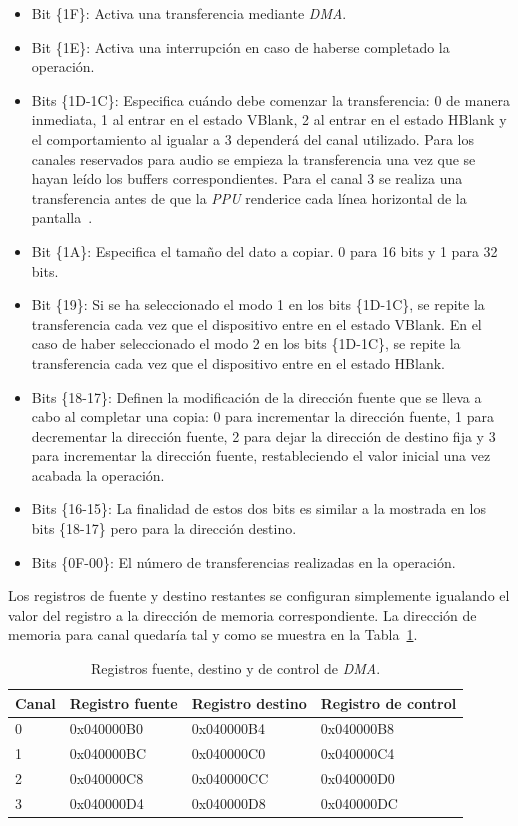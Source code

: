 {\begin{itemize}
	\item Bit \{1F\}: Activa una transferencia mediante \textit{DMA}.
	\item Bit \{1E\}: Activa una interrupción en caso de haberse completado la operación. 
	\item Bits \{1D-1C\}: Especifica cuándo debe comenzar la transferencia: 0 de manera inmediata, 1 al entrar en el estado VBlank, 2 al entrar en el estado HBlank y el comportamiento al igualar a 3 dependerá del canal utilizado. Para los canales reservados para audio se empieza la transferencia una vez que se hayan leído los buffers correspondientes. Para el canal 3 se realiza una transferencia antes de que la \textit{PPU} renderice cada línea horizontal de la pantalla~\cite{bib:tonc}.
	\item Bit \{1A\}: Especifica el tamaño del dato a copiar. 0 para 16 bits y 1 para 32 bits. 
	\item Bit \{19\}: Si se ha seleccionado el modo 1 en los bits \{1D-1C\}, se repite la transferencia cada vez que el dispositivo entre en el estado VBlank. En el caso de haber seleccionado el modo 2 en los bits \{1D-1C\}, se repite la transferencia cada vez que el dispositivo entre en el estado HBlank.
	\item Bits \{18-17\}: Definen la modificación de la dirección fuente que se lleva a cabo al completar una copia: 0 para incrementar la dirección fuente, 1 para decrementar la dirección fuente, 2 para dejar la dirección de destino fija y 3 para incrementar la dirección fuente, restableciendo el valor inicial una vez acabada la operación. 
	\item Bits \{16-15\}: La finalidad de estos dos bits es similar a la mostrada en los bits \{18-17\} pero para la dirección destino.
	\item Bits \{0F-00\}: El número de transferencias realizadas en la operación.
\end{itemize}

Los registros de fuente y destino restantes se configuran simplemente igualando el valor del registro a la dirección de memoria correspondiente. La dirección de memoria para canal quedaría tal y como se muestra en la Tabla~\ref{tab:dma}.

\begin{table}[h]
	\centering
	\begin{tabular}{| l | l | l | l |}
		\hline
		\textbf{Canal} & \textbf{Registro fuente} & \textbf{Registro destino} & \textbf{Registro de control}  \\ \hline
		0 &  0x040000B0 & 0x040000B4 & 0x040000B8 \\ \hline
		1 &  0x040000BC & 0x040000C0 & 0x040000C4 \\ \hline
		2 &  0x040000C8 & 0x040000CC & 0x040000D0 \\ \hline
		3 &  0x040000D4 & 0x040000D8 & 0x040000DC \\ \hline
	\end{tabular}
	\caption{Registros fuente, destino y de control de \textit{DMA}.}\label{tab:dma}
\end{table}
\FloatBarrier{}

}
